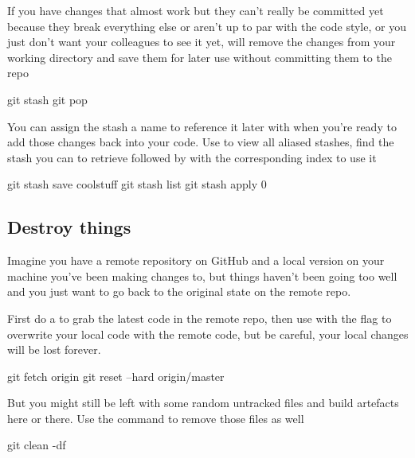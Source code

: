If you have changes that almost work but they can't really be committed yet because they break everything else or aren't up to par with the code style, or you just don't want your colleagues to see it yet,  will remove the changes from your working directory and save them for later use without committing them to the repo

\begin{git-bash}
    git stash
    git pop
\end{git-bash}

You can assign the stash a name to reference it later with  when you're ready to add those changes back into your code. Use  to view all aliased stashes, find the stash you can to retrieve followed by  with the corresponding index to use it

\begin{git-bash}
    git stash save coolstuff
    git stash list
    git stash apply 0
\end{git-bash}



\subsection{Destroy things}

Imagine you have a remote repository on GitHub and a local version on your machine you've been making changes to, but things haven't been going too well and you just want to go back to the original state on the remote repo.

First do a  to grab the latest code in the remote repo, then use  with the  flag to overwrite your local code with the remote code, but be careful, your local changes will be lost forever.

\begin{git-bash}
    git fetch origin
    git reset --hard origin/master
\end{git-bash}

But you might still be left with some random untracked files and build artefacts here or there. Use the  command to remove those files as well

\begin{git-bash}
    git clean -df
\end{git-bash}



